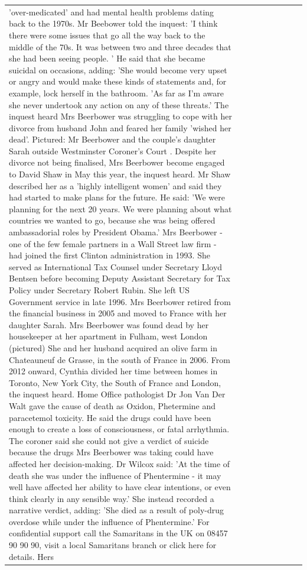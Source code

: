 \begin{table}[H]
\begin{tabular}{lllrlllll}
'over-medicated' and had mental health problems dating back to the 1970s. Mr Beebower told the inquest: 'I think there were some issues that go all the way back to the middle of the 70s. It was between two and three decades that she had been seeing people. ' He said that she became suicidal on occasions, adding: 'She would become very upset or angry and would make these kinds of statements and, for example, lock herself in the bathroom. 'As far as I'm aware she never undertook any action on any of these threats.' The inquest heard Mrs Beerbower was struggling to cope with her divorce from husband John and feared her family 'wished her dead'. Pictured: Mr Beerbower and the couple's daughter Sarah outside Westminster Coroner's Court . Despite her divorce not being finalised, Mrs Beerbower become engaged to David Shaw in May this year, the inquest heard. Mr Shaw described her as a 'highly intelligent women' and said they had started to make plans for the future. He said: 'We were planning for the next 20 years. We were planning about what countries we wanted to go, because she was being offered ambassadorial roles by President Obama.' Mrs Beerbower - one of the few female partners in a Wall Street law firm - had joined the first Clinton administration in 1993. She served as International Tax Counsel under Secretary Lloyd Bentsen before becoming Deputy Assistant Secretary for Tax Policy under Secretary Robert Rubin. She left US Government service in late 1996. Mrs Beerbower retired from the financial business in 2005 and moved to France with her daughter Sarah. Mrs Beerbower was found dead by her housekeeper at her apartment in Fulham, west London (pictured) She and her husband acquired an olive farm in Chateauneuf de Grasse, in the south of France in 2006. From 2012 onward, Cynthia divided her time between homes in Toronto, New York City, the South of France and London, the inquest heard. Home Office pathologist Dr Jon Van Der Walt gave the cause of death as Oxidon, Phetermine and paracetemol toxicity. He said the drugs could have been enough to create a loss of consciousness, or fatal arrhythmia. The coroner said she could not give a verdict of suicide because the drugs Mrs Beerbower was taking could have affected her decision-making. Dr Wilcox said: 'At the time of death she was under the influence of Phentermine - it may well have affected her ability to have clear intentions, or even think clearly in any sensible way.' She instead recorded a narrative verdict, adding: 'She died as a result of poly-drug overdose while under the influence of Phentermine.' For confidential support call the Samaritans in the UK on 08457 90 90 90, visit a local Samaritans branch or click here for details. Hers \\

\end{tabular}
\end{table}
